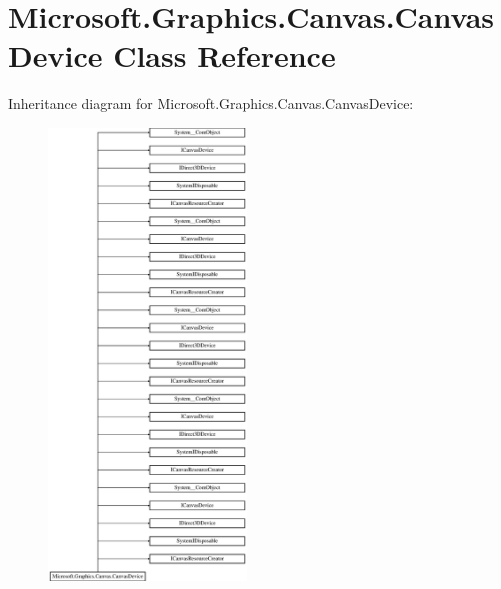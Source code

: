\hypertarget{class_microsoft_1_1_graphics_1_1_canvas_1_1_canvas_device}{}\section{Microsoft.\+Graphics.\+Canvas.\+Canvas\+Device Class Reference}
\label{class_microsoft_1_1_graphics_1_1_canvas_1_1_canvas_device}
Inheritance diagram for Microsoft.\+Graphics.\+Canvas.\+Canvas\+Device\+:\begin{figure}[H]
\begin{center}
\leavevmode
\includegraphics[height=12.000000cm]{class_microsoft_1_1_graphics_1_1_canvas_1_1_canvas_device}
\end{center}
\end{figure}
